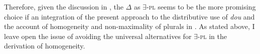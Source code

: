 \documentclass[12pt]{article}
\let\latextextsubscript\textsubscript
\let\textsubscript\latextextsubscript
\newcommand{\sub}[1]{\textsubscript{#1}}
\DeclareMathOperator{\prt}{Part}
\begin{document}
Therefore, given the discussion in , the \(\Delta\) as \(\exists\)-\textsc{pl} seems to be the more promising choice if an integration of the present approach to the distributive use of \emph{dou} and the account of homogeneity and non-maximality of plurals in \citet{bar-levImplicatureAccountHomogeneity2021}.
As stated above, I leave open the issue of avoiding the universal alternatives for \(\exists\)-\textsc{pl} in the derivation of homogeneity.



%
% 
%
% 
%
%
% 
%
%
\end{document}
